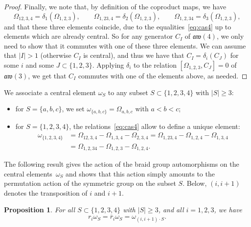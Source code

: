 \documentclass[10pt,a4paper]{amsart}
\numberwithin{equation}{section}
\newtheorem{prop}[theo]{Proposition}
\theoremstyle{definition}
\newcommand{\rb}{\overline{r}}
\begin{document}
\begin{proof}
Finally, we note that, by definition of the coproduct maps, we have
\[\varOmega_{12,3,4}=\delta_1(\varOmega_{1,2,3}) ,\qquad \varOmega_{1,23,4}=\delta_2(\varOmega_{1,2,3}) ,\qquad\varOmega_{1,2,34}=\delta_3(\varOmega_{1,2,3}) ,\]
and that these three elements coincide, due to the equalities~\eqref{eq:cas4} up to elements which are already central. So for any generator $C_I$ of $\mathfrak{aw}(4)$, we only need to show that it commutes with one of these three elements. We can assume that $|I|>1$ (otherwise $C_I$ is central), and thus we have that $C_I=\delta_i(C_J)$ for some $i$ and some $J\subset\{1,2,3\}$. Applying $\delta_i$ to the relation $[\varOmega_{1,2,3},C_J]=0$ of $\mathfrak{aw}(3)$, we get that $C_I$ commutes with one of the elements above, as needed.
\end{proof}

We associate a central element $\omega_S$ to any subset $S\subset\{1,2,3,4\}$ with $|S|\geq3$:
\begin{itemize}\itemsep=0pt
\item for $S=\{a,b,c\}$, we set $\omega_{\{a,b,c\}}=\varOmega_{a,b,c}$ with $a<b<c$;
\item for $S=\{1,2,3,4\}$,
the relations~\eqref{eq:cas4} allow to define a unique element:
\begin{align*}
\omega_{\{1,2,3,4\}}&{}=\varOmega_{12,3,4}-\varOmega_{1,3,4}-\varOmega_{2,3,4}=\varOmega_{1,23,4}-\varOmega_{1,2,4}-\varOmega_{1,3,4}\\
&{}=\varOmega_{1,2,34}-\varOmega_{1,2,3}-\varOmega_{1,2,4} .
\end{align*}
\end{itemize}
The following result gives the action of the braid group automorphisms on the central elements~$\omega_S$ and shows that this action simply amounts to the permutation action of the symmetric group on the subset $S$. Below, $(i,i+1)$ denotes the transposition of $i$ and $i+1$.
\begin{prop}
For all $S\subset \{1,2,3,4\}$ with $|S|\geq 3$, and all $i=1,2,3$, we have
\[r_i\omega_S=\rb_i\omega_S=\omega_{(i,i+1)\cdot S} .\]
\end{prop}
\end{document}
